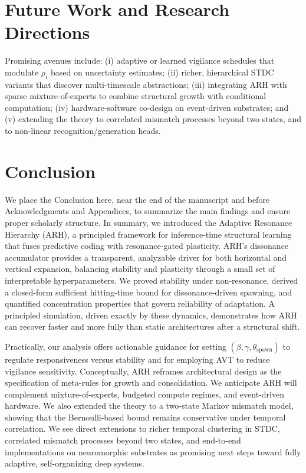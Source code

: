 \documentclass{article}
\numberwithin{figure}{section}
\numberwithin{table}{section}
\numberwithin{algorithm}{section}
\begin{document}
\section{Future Work and Research Directions}
Promising avenues include: (i) adaptive or learned vigilance schedules that modulate $\rho_i$ based on uncertainty estimates; (ii) richer, hierarchical STDC variants that discover multi-timescale abstractions; (iii) integrating ARH with sparse mixture-of-experts to combine structural growth with conditional computation; (iv) hardware-software co-design on event-driven substrates; and (v) extending the theory to correlated mismatch processes beyond two states, and to non-linear recognition/generation heads.

\section{Conclusion}
We place the Conclusion here, near the end of the manuscript and before Acknowledgments and Appendices, to summarize the main findings and ensure proper scholarly structure. In summary, we introduced the Adaptive Resonance Hierarchy (ARH), a principled framework for inference-time structural learning that fuses predictive coding with resonance-gated plasticity. ARH’s dissonance accumulator provides a transparent, analyzable driver for both horizontal and vertical expansion, balancing stability and plasticity through a small set of interpretable hyperparameters. We proved stability under non-resonance, derived a closed-form sufficient hitting-time bound for dissonance-driven spawning, and quantified concentration properties that govern reliability of adaptation. A principled simulation, driven exactly by these dynamics, demonstrates how ARH can recover faster and more fully than static architectures after a structural shift.

Practically, our analysis offers actionable guidance for setting $(\beta,\gamma,\theta_{\text{spawn}})$ to regulate responsiveness versus stability and for employing AVT to reduce vigilance sensitivity. Conceptually, ARH reframes architectural design as the specification of meta-rules for growth and consolidation. We anticipate ARH will complement mixture-of-experts, budgeted compute regimes, and event-driven hardware. We also extended the theory to a two-state Markov mismatch model, showing that the Bernoulli-based bound remains conservative under temporal correlation. We see direct extensions to richer temporal clustering in STDC, correlated mismatch processes beyond two states, and end-to-end implementations on neuromorphic substrates as promising next steps toward fully adaptive, self-organizing deep systems.
\end{document}
